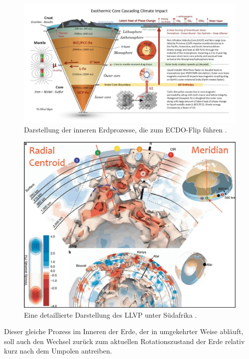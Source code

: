 \documentclass[10pt,twocolumn,letterpaper]{article}
\begin{document}
\begin{figure}[t]
\begin{center}
\includegraphics[width=1\textwidth]{layers.jpg}
\end{center}
   \caption{Darstellung der inneren Erdprozesse, die zum ECDO-Flip führen \cite{129}.}
\label{fig:11}
\end{figure}
\begin{figure}[t]
\begin{center}
   \includegraphics[width=1\linewidth]{llvp.jpg}
\end{center}
   \caption{Eine detaillierte Darstellung des LLVP unter Südafrika \cite{28}.}
\label{fig:12}
\label{fig:onecol}
\end{figure}


Dieser gleiche Prozess im Inneren der Erde, der in umgekehrter Weise abläuft, soll auch den Wechsel zurück zum aktuellen Rotationszustand der Erde relativ kurz nach dem Umpolen antreiben.
\end{document}
